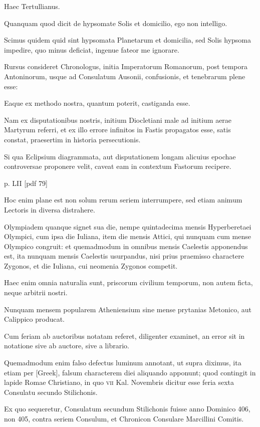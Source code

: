 \begin{parnumbers}
Haec Tertullianus.

Quanquam quod dicit de hypsomate Solis
et domicilio, ego non intelligo.

Scimus quidem quid sint hypsomata
Planetarum et domicilia, sed Solis hypsoma impedire, quo minus
deficiat, ingenue fateor me ignorare.

Rursus consideret Chronologus,
initia Imperatorum Romanorum, post tempora Antoninorum,
usque ad Consulatum Ausonii, confusionis, et tenebrarum plene esse:

Eaque ex methodo nostra, quantum poterit, castiganda esse.

Nam ex disputationibus
nostris, initium Diocletiani male ad initium aerae Martyrum
referri, et ex illo errore infinitos in Fastis propagatos esse, satis
constat, praesertim in historia persecutionis.

Si qua Eclipsium diagrammata,
aut disputationem longam alicuius epochae controversae proponere
velit, caveat eam in contextum Fastorum recipere.

\clearpage
p. LII [pdf 79]

Hoc enim
plane est non solum rerum seriem interrumpere, sed etiam animum
Lectoris in diversa distrahere.

Olympiadem quanque signet sua die,
nempe quintadecima mensis Hyperberetaei Olympici, cum ipsa die
Iuliana, item die mensis Attici, qui nunquam cum mense Olympico
congruit: et quemadmodum in omnibus mensis Caelestis apponendus
est, ita nunquam mensis Caelestis usurpandus, nisi prius praemisso charactere
Zygonos, et die Iuliana, cui neomenia Zygonos competit.

Haec enim omnia naturalia sunt, priscorum civilium temporum, non
autem ficta, neque arbitrii nostri.

Nunquam mensem popularem Atheniensium
sine mense prytanias Metonico, aut Calippico producat.

Cum feriam ab auctoribus notatam referet, diligenter examinet, an
error sit in notatione sive ab auctore, sive a librario.

Quemadmodum
enim falso defectus luminum annotant, ut supra diximus, ita etiam
per \textgreek{[Greek]}, falsum characterem diei aliquando apponunt;
 quod contingit
in lapide Romae Christiano, in quo \textsc{vii} Kal. Novembris dicitur
esse feria sexta Consulatu secundo Stilichonis.

Ex quo sequeretur, Consulatum
secundum Stilichonis fuisse anno Dominico 406, non 405,
contra seriem Consulum, et Chronicon Consulare Marcillini Comitis.


\end{parnumbers}
